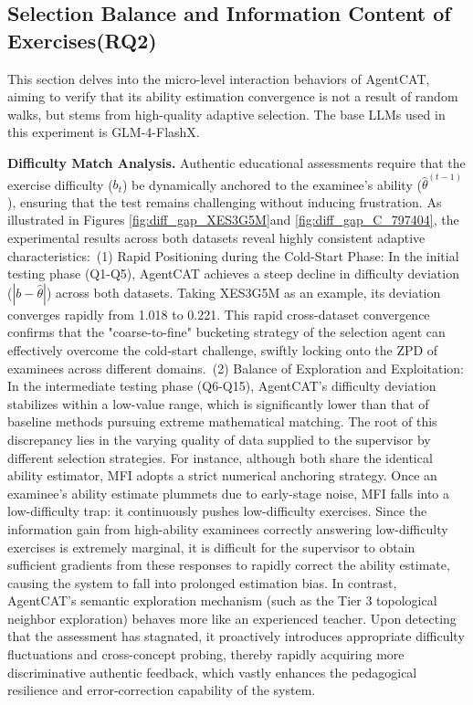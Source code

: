 
\vspace{-0.5em}
\subsection{Selection Balance and Information Content of Exercises(RQ2)}
This section delves into the micro-level interaction behaviors of AgentCAT, aiming to verify that its ability estimation convergence is not a result of random walks, but stems from high-quality adaptive selection. The base LLMs used in this experiment is GLM-4-FlashX.

\textbf{Difficulty Match Analysis.} Authentic educational assessments require that the exercise difficulty ($b_t$) be dynamically anchored to the examinee's ability ($\hat{\theta}^{(t-1)}$), ensuring that the test remains challenging without inducing frustration. As illustrated in Figures \ref{fig:diff_gap_XES3G5M}and \ref{fig:diff_gap_C_797404}, the experimental results across both datasets reveal highly consistent adaptive characteristics:~(1) Rapid Positioning during the Cold-Start Phase: In the initial testing phase (Q1-Q5), AgentCAT achieves a steep decline in difficulty deviation ($|b - \hat{\theta}|$) across both datasets. Taking XES3G5M as an example, its deviation converges rapidly from 1.018 to 0.221. This rapid cross-dataset convergence confirms that the "coarse-to-fine" bucketing strategy of the selection agent can effectively overcome the cold-start challenge, swiftly locking onto the ZPD of examinees across different domains.~(2) Balance of Exploration and Exploitation: In the intermediate testing phase (Q6-Q15), AgentCAT's difficulty deviation stabilizes within a low-value range, which is significantly lower than that of baseline methods pursuing extreme mathematical matching. The root of this discrepancy lies in the varying quality of data supplied to the supervisor by different selection strategies. For instance, although both share the identical ability estimator, MFI adopts a strict numerical anchoring strategy. Once an examinee's ability estimate plummets due to early-stage noise, MFI falls into a low-difficulty trap: it continuously pushes low-difficulty exercises. Since the information gain from high-ability examinees correctly answering low-difficulty exercises is extremely marginal, it is difficult for the supervisor to obtain sufficient gradients from these responses to rapidly correct the ability estimate, causing the system to fall into prolonged estimation bias. In contrast, AgentCAT's semantic exploration mechanism (such as the Tier 3 topological neighbor exploration) behaves more like an experienced teacher. Upon detecting that the assessment has stagnated, it proactively introduces appropriate difficulty fluctuations and cross-concept probing, thereby rapidly acquiring more discriminative authentic feedback, which vastly enhances the pedagogical resilience and error-correction capability of the system.


